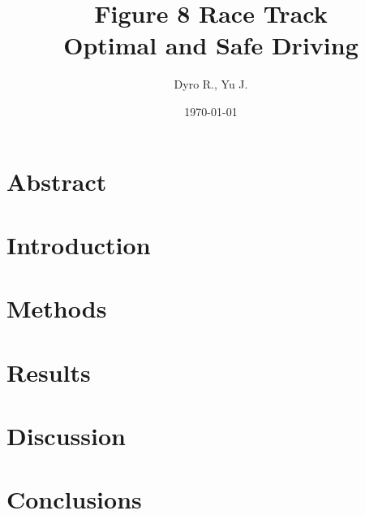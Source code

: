 \documentclass[lettersize,twocolumn]{article}
\title{Figure 8 Race Track\\Optimal and Safe Driving}
\author{Dyro R., Yu J.}
\date{\today}
\numberwithin{equation}{section}
\begin{document}
\onecolumn
\clearpage\maketitle
\tableofcontents
\newpage
\twocolumn

\section{Abstract}


\newpage
\section{Introduction}


\section{Methods}


\section{Results}


\section{Discussion}


\section{Conclusions}


\newpage
{}
\end{document}

